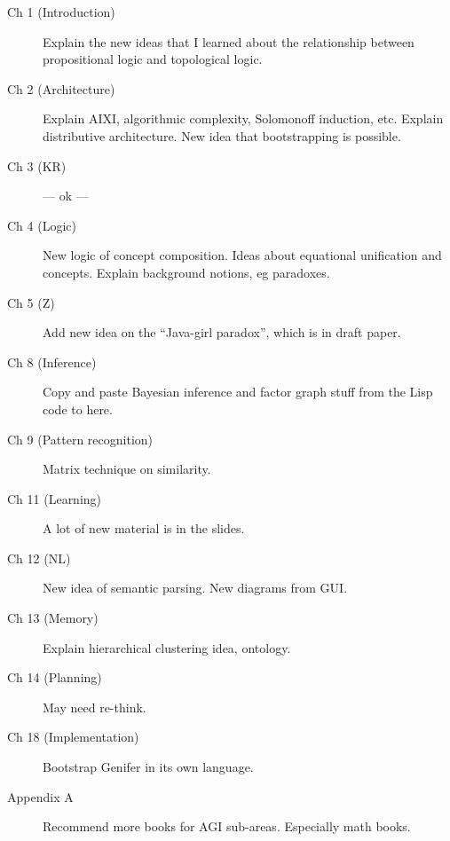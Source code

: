 \documentclass[12pt, a4paper]{report}
\theoremstyle{examples} \newtheorem{example}{Example}[section]
\begin{document}
\begin{description}

\item[Ch 1 (Introduction)]  Explain the new ideas that I learned about the relationship between propositional logic and topological logic.

\item[Ch 2 (Architecture)]  Explain AIXI, algorithmic complexity, Solomonoff induction, etc.  Explain distributive architecture.  New idea that bootstrapping is possible.

\item[Ch 3 (KR)] --- ok ---

\item[Ch 4 (Logic)]  New logic of concept composition.  Ideas about equational unification and concepts.  Explain background notions, eg paradoxes.

\item[Ch 5 (Z)]  Add new idea on the ``Java-girl paradox'', which is in draft paper.

\item[Ch 8 (Inference)]  Copy and paste Bayesian inference and factor graph stuff from the Lisp code to here.

\item[Ch 9 (Pattern recognition)]  Matrix technique on similarity.

\item[Ch 11 (Learning)]  A lot of new material is in the slides.

\item[Ch 12 (NL)] New idea of semantic parsing.  New diagrams from GUI.

\item[Ch 13 (Memory)]  Explain hierarchical clustering idea, ontology.

\item[Ch 14 (Planning)]  May need re-think.

\item[Ch 18 (Implementation)]  Bootstrap Genifer in its own language.

\item[Appendix A]  Recommend more books for AGI sub-areas.  Especially math books.

\end{description}

\color{black}

\tableofcontents





















\end{document}
